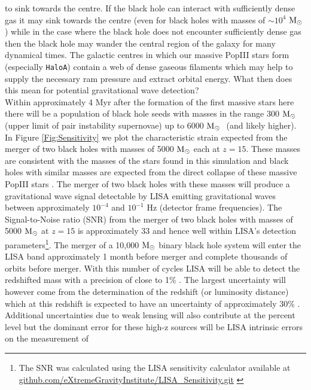\documentclass[graphics, twocolumn, usenatbib]{mn2e}
\newcommand{\msolar} {$\rm{M_{\odot}}~$}
\newcommand{\msolarc} {$\rm{M_{\odot}}$}
\newcommand{\hac} {\texttt{HaloA}}
\begin{document}
to sink towards the centre. If the black hole can interact with sufficiently dense gas it may
sink towards the centre (even for black holes with masses of $\sim 10^4$ \msolarc) while in
the case where the black hole does not encounter sufficiently dense gas then the black hole
may wander the central region of the galaxy for many dynamical times. The galactic centres
in which our massive PopIII
stars form (especially \hac) contain a web of dense gaseous filaments which may help to supply
the necessary ram pressure and extract orbital energy. 
What then does this mean for potential gravitational wave detection?\\
\indent Within approximately 4 Myr after the formation of the first massive stars here there
will be a population of black hole seeds with masses in the range 300 \msolar (upper limit of pair
instability supernovae) up to 6000 \msolar
(and likely higher). In Figure \ref{Fig:Sensitivity} we plot the characteristic strain
expected from the merger of two black holes with masses of 5000 \msolar each at $z = 15$.
These masses are consistent with the masses of the stars found in this simulation and black holes
with similar masses are expected from the direct collapse of these massive PopIII
stars \citep{Heger_2003}. The merger of two black holes with these masses will produce a
gravitational wave signal detectable by LISA \citep{eLISA, Sesana_2016, Cornish_2020} emitting
gravitational waves between approximately $10^{-4}$ and $10^{-1}$ Hz (detector frame frequencies). The
Signal-to-Noise ratio (SNR) from the merger of two black holes with masses of 5000 \msolar at $z = 15$
is approximately 33 and hence well within LISA's detection parameters\footnote{The SNR was calculated
  using the LISA sensitivity calculator available at
  \url{github.com/eXtremeGravityInstitute/LISA_Sensitivity.git} \citep{Robson_2019}}.
The merger of a 10,000 \msolar binary
black hole system will enter the LISA band approximately 1 month before merger and complete
thousands of orbits before merger. With this number of cycles LISA will be able to detect
the redshifted mass with a precision of close to 1\% \citep{Sesana_2013}. The largest uncertainty
will however come from the determination of the redshift (or luminosity distance) which at this
redshift is expected to have an uncertainty of approximately 30\% \citep{Sesana_2013}. Additional
uncertainties due to weak lensing will also contribute at the percent level
\citep{Shapiro_2010, Petiteau_2011}
but the dominant error for these high-z sources will be LISA intrinsic errors on the measurement of
\end{document}
